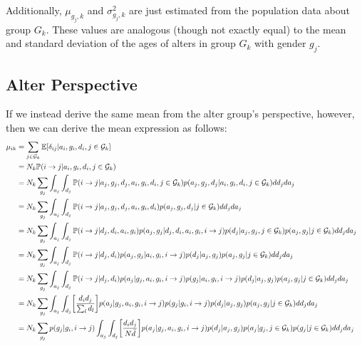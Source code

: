 \documentclass[12pt]{article}
\begin{document}
\noindent Additionally, $\mu_{g_j,k}$ and $\sigma_{g_j,k}^2$ are just estimated from the population data about group $G_k$. These values are analogous (though not exactly equal) to the mean and standard deviation of the ages of alters in group $G_k$ with gender $g_j$.

\pagebreak
\subsection{Alter Perspective}

\noindent  If we instead derive the same mean from the alter group's perspective, however, then we can derive the mean expression as follows:
\begin{align}
\mu_{ik}  &= \sum_{j \in \mathcal{G}_k} \ex[\delta_{ij} | a_i, g_i, d_i, j \in \mathcal{G}_k] 
&& \\\nonumber
&= N_k \prob(i \to j | a_i, g_i, d_i, j \in \mathcal{G}_k) 
&& \\\nonumber
&= N_k \sum_{g_j} \int_{a_j} \int_{d_j} \prob(i \to j | a_j, g_j, d_j, a_i, g_i, d_i, j \in \mathcal{G}_k) p(a_j, g_j, d_j | a_i, g_i, d_i, j \in \mathcal{G}_k) dd_j da_j 
&& \\\nonumber
&= N_k \sum_{g_j} \int_{a_j} \int_{d_j} \prob(i \to j | a_j, g_j, d_j, a_i, g_i, d_i) p(a_j, g_j, d_j | j \in \mathcal{G}_k) dd_j da_j 
&& \\\nonumber
&= N_k \sum_{g_j} \int_{a_j} \int_{d_j} \prob(i \to j | d_j, d_i, a_i, g_i) p(a_j, g_j | d_j, d_i, a_i, g_i, i \to j) p(d_j | a_j, g_j, j \in \mathcal{G}_k) p(a_j, g_j | j \in \mathcal{G}_k)  dd_j da_j 
&& \\\nonumber
&= N_k \sum_{g_j} \int_{a_j} \int_{d_j} \prob(i \to j | d_j, d_i) p(a_j, g_j | a_i, g_i, i \to j) p(d_j | a_j, g_j) p(a_j, g_j | j \in \mathcal{G}_k)  dd_j da_j 
&& \\\nonumber
&= N_k \sum_{g_j} \int_{a_j} \int_{d_j} \prob(i \to j | d_j, d_i) p(a_j | g_j, a_i, g_i, i \to j) p(g_j | a_i, g_i, i \to j) p(d_j | a_j, g_j) p(a_j, g_j | j \in \mathcal{G}_k)  dd_j da_j 
&& \\\nonumber
&= N_k \sum_{g_j} \int_{a_j} \int_{d_j} \biggl[ \frac{d_i d_j}{\sum_l d_l} \biggr]  p(a_j | g_j, a_i, g_i, i \to j) p(g_j|g_i, i \to j) p(d_j | a_j, g_j) p(a_j, g_j | j \in \mathcal{G}_k)  dd_j da_j 
&& \\\nonumber
&= N_k \sum_{g_j} p(g_j|g_i, i \to j) \int_{a_j} \int_{d_j}  \biggl[ \frac{d_i d_j}{N \bar{d}} \biggr]  p(a_j | g_j, a_i, g_i, i \to j) p(d_j | a_j, g_j) p(a_j | g_j, j \in \mathcal{G}_k) p(g_j | j \in \mathcal{G}_k) dd_j da_j 

\end{align}
\end{document}
